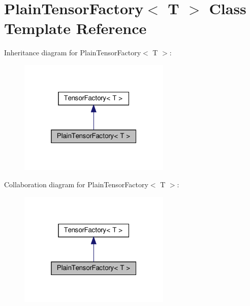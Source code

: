 \hypertarget{classPlainTensorFactory}{}\section{Plain\+Tensor\+Factory$<$ T $>$ Class Template Reference}
\label{classPlainTensorFactory}


Inheritance diagram for Plain\+Tensor\+Factory$<$ T $>$\+:
\nopagebreak
\begin{figure}[H]
\begin{center}
\leavevmode
\includegraphics[width=205pt]{classPlainTensorFactory__inherit__graph}
\end{center}
\end{figure}


Collaboration diagram for Plain\+Tensor\+Factory$<$ T $>$\+:
\nopagebreak
\begin{figure}[H]
\begin{center}
\leavevmode
\includegraphics[width=205pt]{classPlainTensorFactory__coll__graph}
\end{center}
\end{figure}
